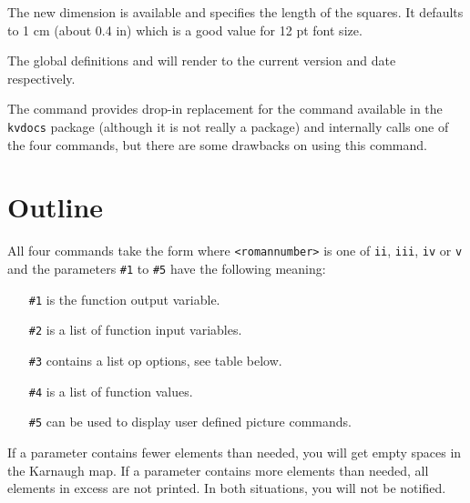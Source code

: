 \documentclass[a4paper,10pt]{ltxdoc}
\newcommand\Package[1]{\texttt{#1}}
\begin{document}
The new dimension  is available and specifies
the length of the squares. It defaults to 1 cm (about 0.4 in) which is a good
value for 12 pt font size.

The global definitions  and  will render
to the current version and date respectively.

The command  provides drop-in replacement for the 
command available in the \Package{kvdocs} package (although it is not really a
package) and internally calls one of the four
commands, but there are some drawbacks on using this command.

\newpage
\section{Outline}
\label{sec:outline}
All four commands take the form
where \texttt{<romannumber>} is one of \texttt{ii}, \texttt{iii}, \texttt{iv}
or \texttt{v} and the parameters \texttt{\#1} to \texttt{\#5} have the
following meaning:

\begin{itemize}
	\itemsep0pt
	\item[\texttt{\#1}] is the function output variable.
	\item[\texttt{\#2}] is a list of function input variables.
	\item[\texttt{\#3}] contains a list op options, see table below.
	\item[\texttt{\#4}] is a list of function values.
	\item[\texttt{\#5}] can be used to display user defined picture commands.
\end{itemize}

If a parameter contains fewer elements than needed, you will get empty spaces
in the Karnaugh map. If a parameter contains more elements than needed, all
elements in excess are not printed. In both situations, you will not be
notified.\newline
\end{document}
